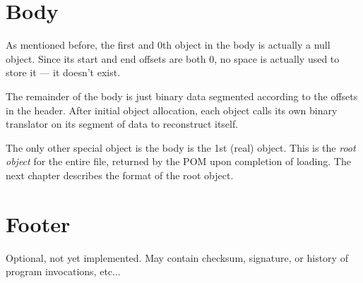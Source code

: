\section{Body}
\label{sec:skeleton:body}

As mentioned before, 
the first and 0th object in the body is actually a null object.  
Since its start and end offsets are both $0$, no space is actually
used to store it --- it doesn't exist.  

The remainder of the body is just binary data segmented according to the
offsets in the header.  
After initial object allocation, each object calls its own binary translator
on its segment of data to reconstruct itself.  

The only other special object is the body is the 1st (real) object.  
This is the \emph{root object}  for the entire file, 
returned by the POM upon completion of loading.  
The next chapter describes the format of the root object.  

\section{Footer}
\label{sec:skeleton:footer}

Optional, not yet implemented.  
May contain checksum, signature, or history of program invocations, etc...


